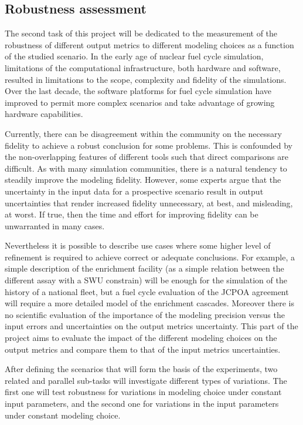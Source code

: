 
\subsection{Robustness assessment}

The second task of this project will be dedicated to the measurement of the
robustness of different output metrics to different modeling choices as a
function of the studied scenario.  In the early age of nuclear fuel cycle
simulation, limitations of the computational infrastructure, both hardware and
software, resulted in limitations to the scope, complexity and fidelity of the
simulations.  Over the last decade, the software platforms for fuel cycle
simulation have improved to permit more complex scenarios and take advantage
of growing hardware capabilities.

Currently, there can be disagreement within the community on the necessary
fidelity to achieve a robust conclusion for some problems.  This is confounded
by the non-overlapping features of different tools such that direct
comparisons are difficult. As with many simulation communities, there is a
natural tendency to steadily improve the modeling fidelity.  However, some
experts argue that the uncertainty in the input data for a prospective
scenario result in output uncertainties that render increased fidelity
unnecessary, at best, and misleading, at worst.  If true, then the time and
effort for improving fidelity can be unwarranted in many cases.

Nevertheless it is possible to describe use cases where some higher level of
refinement is required to achieve correct or adequate conclusions. For
example, a simple description of the enrichment facility (as a simple relation
between the different assay with a SWU constrain) will be enough for the
simulation of the history of a national fleet, but a fuel cycle evaluation of
the JCPOA agreement will require a more detailed model of the enrichment
cascades. Moreover there is no scientific evaluation of the importance of the
modeling precision versus the input errors and uncertainties on the output
metrics uncertainty. This part of the project aims to evaluate the impact of
the different modeling choices on the output metrics and compare them to that
of the input metrics uncertainties.

After defining the scenarios that will form the basis of the experiments, two
related and parallel sub-tasks will investigate different types of variations.
The first one will test robustness for variations in modeling choice under
constant input parameters, and the second one for variations in the input
parameters under constant modeling choice.

